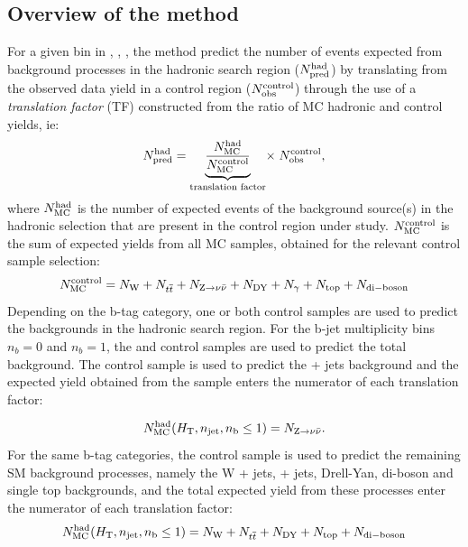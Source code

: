 \subsection{Overview of the method\label{sec:background-method}}

For a given bin in \scalht, \njet, \nb, the method predict the number 
of events expected from background processes in the hadronic search region ($N_{\textrm{pred}}^{\rm  had}$) 
by translating from the observed data yield in a control region 
($N_{\textrm{obs}}^{\rm  control}$) through the use of a {\it translation factor} 
(TF) constructed from the ratio of MC hadronic and control yields, ie:
\begin{equation}
  \label{equ:pred-method}
  N_{\textrm{pred}}^{\rm had} = \underbrace{\frac{N_{\rm MC}^{\rm
      had}}{N_{\rm MC}^{\rm
      control}}}_\text{translation factor}\! \times \; N_{\textrm{obs}}^{\rm    control},   
\end{equation}
where $N_{\rm MC}^{\rm had}$ is the number of expected events of the background
source(s) in the hadronic selection that are present in the control region under study.
$N_{\rm MC}^{\rm control}$ is the sum of expected yields from all MC samples, 
obtained for the relevant control sample selection:
\begin{equation}
  \label{equ:ratio-denom}
  N_{\rm MC}^{\rm control} = N_{\rm W} + N_{\relax{t}\overline{\relax{t}}} + N_{{\text Z} \rightarrow \nu\bar{\nu}} +
N_{\rm DY} + N_{\gamma} + N_{\rm top} + N_{\rm di-boson}
\end{equation}
Depending on the b-tag category, one or both control samples are used 
to predict the backgrounds in the hadronic search region. For the b-jet 
multiplicity bins $n_b = 0$ and $n_b = 1$, the \mj and \gj control samples 
are used to predict the total background. The \gj control
sample is used to predict the \znunu + jets background and the expected yield
obtained from the \znunu sample enters the numerator of each translation
factor:

\begin{equation}
  \label{equ:ratio-numer-gj}
  N_{\rm MC}^{\rm had}(\mbox{$H_\text{T}$},n_{\text{jet}},n_{\text{b}} \leq 1) = N_{{\text Z} \rightarrow \nu\bar{\nu}}.
\end{equation}
%
For the same b-tag categories, the \mj control sample is used to predict 
the remaining SM background processes, namely the W + jets, \ttbar + jets,
Drell-Yan, di-boson and single top backgrounds, and the total expected yield
from these processes enter the numerator of each translation factor:
%
\begin{equation}
  \label{equ:ratio-numer-mj}
  N_{\rm MC}^{\rm had}(\mbox{$H_\text{T}$},n_{\text{jet}},n_{\text{b}} \leq 1) = N_{\rm W} +
  N_{\relax{t}\overline{\relax{t}}} + N_{\rm DY} + N_{\rm top} + N_{\rm di-boson}
\end{equation}

